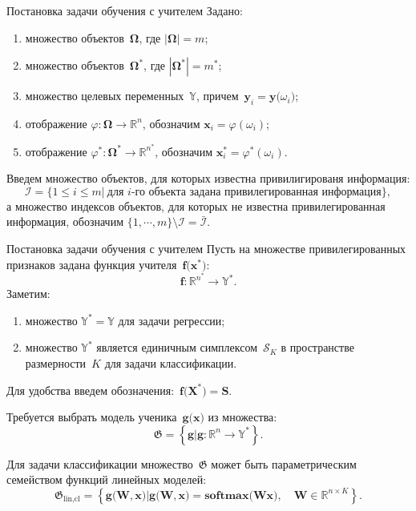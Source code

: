 \documentclass[9pt,pdf,hyperref={unicode}]{beamer}
\begin{document}
\begin{frame}{Постановка задачи обучения с учителем}
\justifying
Задано:\\
\begin{enumerate}
	\item множество объектов~$\bm{\Omega}$, где $\left|\bm{\Omega}\right| = m$;
	\item множество объектов~$\bm{\Omega}^*$, где $\left|\bm{\Omega}^*\right| = m^*$;
	\item множество целевых переменных~$\mathbb{Y}$, причем~$\mathbf{y}_i = \mathbf{y}\bigr(\omega_i\bigr)$;
	\item отображение $\varphi:\bm{\Omega} \to \mathbb{R}^{n}$, обозначим $\mathbf{x}_i = \varphi(\omega_i)$;
	\item отображение $\varphi^*:\bm{\Omega}^* \to \mathbb{R}^{n^*}$, обозначим $\mathbf{x}^*_i = \varphi^*(\omega_i)$.
\end{enumerate}
Введем множество объектов, для которых известна привилигированя информация:
\[
\mathcal{I} = \{1 \leq i \leq m |~\text{для $i$-го объекта задана привилегированная информация}\},
\]
а множество индексов объектов, для которых не известна привилегированная информация, обозначим $\{1, \cdots, m\}\setminus \mathcal{I} = \bar{\mathcal{I}}$.

\end{frame}
\begin{frame}{Постановка задачи обучения с учителем}
\justifying
Пусть на множестве привилегированных признаков задана функция учителя~$\mathbf{f}\bigr(\mathbf{x}^*\bigr)$:
\[
\mathbf{f}:\mathbb{R}^{n^*} \to \mathbb{Y}^*.
\]
Заметим:
\begin{enumerate}
	\item множество $\mathbb{Y}^*=\mathbb{Y}$ для задачи регрессии;
	\item множество $\mathbb{Y}^*$ является единичным симплексом~$\mathcal{S}_K$ в пространстве размерности~$K$ для задачи классификации. 
\end{enumerate}
Для удобства введем обозначения:~$\mathbf{f}\bigr(\mathbf{X}^*\bigr)=\mathbf{S}$.

Требуется выбрать модель ученика~$\mathbf{g}\bigr(\mathbf{x}\bigr)$ из множества:
\[
\mathfrak{G} = \left\{\mathbf{g}| \mathbf{g}:\mathbb{R}^{n} \to \mathbb{Y}^*\right\}.
\]

Для задачи классификации множество~$\mathfrak{G}$ может быть параметрическим семейством функций линейных моделей:
\[
\mathfrak{G}_\text{lin,cl} = \left\{\mathbf{g}\bigr(\mathbf{W}, \mathbf{x}\bigr)| \mathbf{g}\bigr(\mathbf{W}, \mathbf{x}\bigr) = \textbf{softmax}\bigr(\mathbf{W}\mathbf{x}\bigr), \quad \mathbf{W} \in \mathbb{R}^{n\times K}\right\}.
\]
\end{frame}
\end{document}
